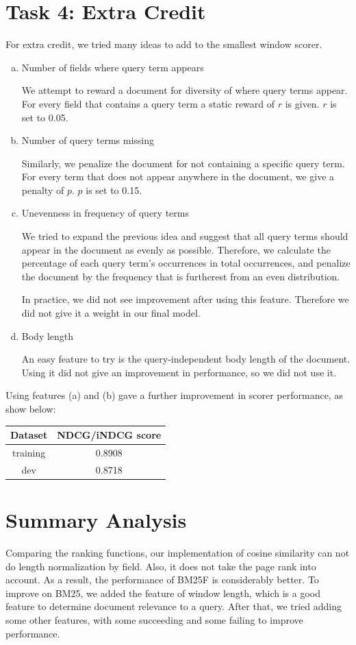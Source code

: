\documentclass[10pt,twocolumn]{article}
\begin{document}
\section*{Task 4: Extra Credit}
For extra credit, we tried many ideas to add to the smallest window scorer.
\begin{enumerate}[(a)]
\item Number of fields where query term appears

We attempt to reward a document for diversity of where query terms appear. For every field that contains a query term a static reward of $r$ is given. $r$ is set to 0.05.
\item Number of query terms missing

Similarly, we penalize the document for not containing a specific query term. For every term that does not appear anywhere in the document, we give a penalty of $p$. $p$ is set to 0.15.
\item Unevenness in frequency of query terms

We tried to expand the previous idea and suggest that all query terms should appear in the document as evenly as possible. Therefore, we calculate the percentage of each query term's occurrences in total occurrences, and penalize the document by the frequency that is furtherest from an even distribution.

In practice, we did not see improvement after using this feature. Therefore we did not give it a weight in our final model.
\item Body length

An easy feature to try is the query-independent body length of the document. Using it did not give an improvement in performance, so we did not use it.
\end{enumerate}
Using features (a) and (b) gave a further improvement in scorer performance, as show below:
\begin{table}[H]
\centering
\begin{tabular}{|c|c|}
\hline
Dataset & NDCG/iNDCG score \\\hline
training & 0.8908\\\hline
dev & 0.8718\\\hline
\end{tabular}
\end{table}
\section*{Summary Analysis}
Comparing the ranking functions, our implementation of cosine similarity can not do length normalization by field. Also, it does not take the page rank into account. As a result, the performance of BM25F is considerably better. To improve on BM25, we added the feature of window length, which is a good feature to determine document relevance to a query. After that, we tried adding some other features, with some succeeding and some failing to improve performance. 
\end{document}
